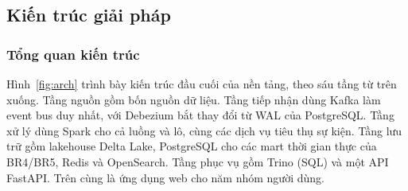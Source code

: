 \subsection{Kiến trúc giải pháp}
\label{chap:architecture}

\subsubsection{Tổng quan kiến trúc}

Hình~\ref{fig:arch} trình bày kiến trúc đầu cuối của nền tảng, theo sáu tầng từ trên xuống. Tầng nguồn gồm bốn nguồn dữ liệu. Tầng tiếp nhận dùng Kafka làm event bus duy nhất, với Debezium bắt thay đổi từ WAL của PostgreSQL. Tầng xử lý dùng Spark cho cả luồng và lô, cùng các dịch vụ tiêu thụ sự kiện. Tầng lưu trữ gồm lakehouse Delta Lake, PostgreSQL cho các mart thời gian thực của BR4/BR5, Redis và OpenSearch. Tầng phục vụ gồm Trino (SQL) và một API FastAPI. Trên cùng là ứng dụng web cho năm nhóm người dùng.

